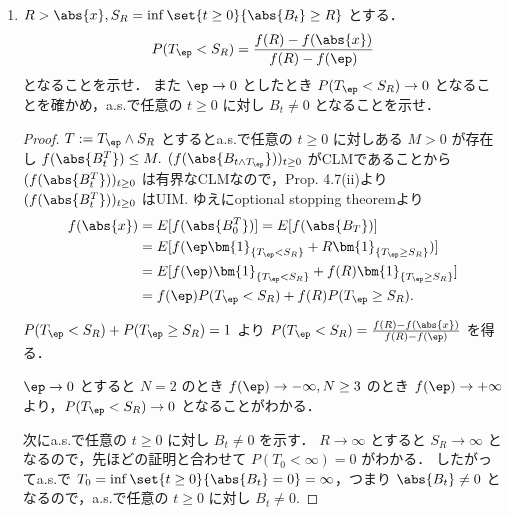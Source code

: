 \documentclass{jsarticle}
\begin{document}
\begin{enumerate}
    \item
    $R>\abs{x},S_R=\inf\set{t\ge0}{\abs{B_t}\ge R}$ とする．
    $$
    P(T_\ep<S_R)=\frac{f(R)-f(\abs{x})}{f(R)-f(\ep)}
    $$
    となることを示せ．
    また $\ep\to0$ としたとき $P(T_\ep<S_R)\to0$ となることを確かめ，a.s.で任意の $t\ge0$ に対し $B_t\neq0$ となることを示せ．
    \begin{proof}
        $T:=T_\ep\wedge S_R$ とするとa.s.で任意の $t\ge0$ に対しある $M>0$ が存在し $f(\abs{B_t^T})\le M.$
        $(f(\abs{B_{t\wedge T_\ep}}))_{t\ge0}$ がCLMであることから $(f(\abs{B_t^T}))_{t\ge0}$ は有界なCLMなので，Prop. 4.7(ii)より $(f(\abs{B_t^T}))_{t\ge0}$ はUIM.
        ゆえにoptional stopping theoremより
        \begin{align}
            f(\abs{x})
            &= E[f(\abs{B_0^T})]
            = E[f(\abs{B_T})] \\
            &= E[f(\ep\bm{1}_{\{T_\ep<S_R\}}+R\bm{1}_{\{T_\ep\ge S_R\}})] \\
            &= E[f(\ep)\bm{1}_{\{T_\ep<S_R\}}+f(R)\bm{1}_{\{T_\ep\ge S_R\}}] \\
            &= f(\ep)P(T_\ep<S_R)+f(R)P(T_\ep\ge S_R).
        \end{align}

        $P(T_\ep<S_R)+P(T_\ep\ge S_R)=1$ より $P(T_\ep<S_R)=\frac{f(R)-f(\abs{x})}{f(R)-f(\ep)}$ を得る．

        $\ep\to0$ とすると $N=2$ のとき $f(\ep)\to -\infty, N\ge3$ のとき $f(\ep)\to +\infty$ より，$P(T_\ep<S_R)\to0$ となることがわかる．

        次にa.s.で任意の $t\ge0$ に対し $B_t\neq0$ を示す．
        $R\to\infty$ とすると $S_R\to\infty$ となるので，先ほどの証明と合わせて $P(T_0<\infty)=0$ がわかる．
        したがってa.s.で $T_0=\inf\set{t\ge0}{\abs{B_t}=0}=\infty$，つまり $\abs{B_t}\neq0$ となるので，a.s.で任意の $t\ge0$ に対し $B_t\neq0.$
    \end{proof}
    

\end{enumerate}
\end{document}

